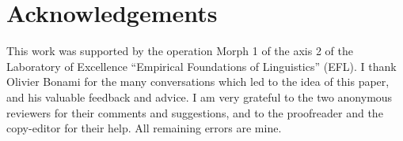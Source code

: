 \documentclass[output=paper]{langscibook}
\begin{document}
    \section*{Acknowledgements}
    This work was supported by the operation Morph 1 of the axis 2 of
    the Laboratory of Excellence ``Empirical Foundations of
    Linguistics'' (EFL). I thank Olivier Bonami for the many
    conversations which led to the idea of this paper, and his
    valuable feedback and advice. I am very grateful to the two
    anonymous reviewers for their comments and suggestions, and to the
    proofreader and the copy-editor for their help. All remaining errors are mine.

    {\sloppy\printbibliography[heading=subbibliography,notkeyword=this]}
\end{document}

